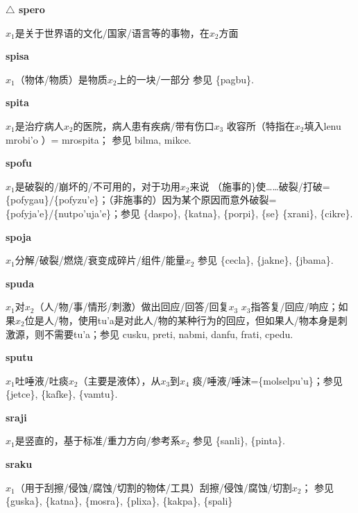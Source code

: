 \documentclass[notitlepage,twocolumn,a4paper,10pt]{book}
\begin{document}
{\sffamily\bfseries $\triangle$ spero} $x_1$是关于世界语的文化\slash{}国家\slash{}语言等的事物，在$x_2$方面

{\sffamily\bfseries spisa}\enspace {\ttfamily\bfseries[    spi]}  $x_1$（物体\slash{}物质）是物质$x_2$上的一块\slash{}一部分 \textemdash{} 参见 \{pagbu\}.

{\sffamily\bfseries spita} $x_1$是治疗病人$x_2$的医院，病人患有疾病\slash{}带有伤口$x_3$ \textemdash{} 收容所（特指在$x_2$填入lenu mrobi'o ）= {mrospita}； 参见 {bilma}, {mikce}.

{\sffamily\bfseries spofu}\enspace {\ttfamily\bfseries[pof     po'u]}  $x_1$是破裂的\slash{}崩坏的\slash{}不可用的，对于功用$x_2$来说 \textemdash{} （施事的\}使……破裂\slash{}打破= \{pofygau\}\slash{}\{pofyzu'e\}；（非施事的）因为某个原因而意外破裂= \{pofyja'e\}\slash{}\{nutpo'uja'e\}；参见 \{daspo\}, \{katna\}, \{porpi\}, \{se\} \{xrani\}, \{cikre\}.

{\sffamily\bfseries spoja}\enspace {\ttfamily\bfseries[poj     po'a]}  $x_1$分解\slash{}破裂\slash{}燃烧\slash{}衰变成碎片\slash{}组件\slash{}能量$x_2$ \textemdash{} 参见 \{cecla\}, \{jakne\}, \{jbama\}.

{\sffamily\bfseries spuda}\enspace {\ttfamily\bfseries[    spu]}  $x_1$对$x_2$（人\slash{}物\slash{}事\slash{}情形\slash{}刺激）做出回应\slash{}回答\slash{}回复$x_3$ \textemdash{} $x_3$指答复\slash{}回应\slash{}响应；如果$x_2$位是人\slash{}物，使用tu'a是对此人\slash{}物的某种行为的回应，但如果人\slash{}物本身是刺激源，则不需要tu'a；参见 {cusku}, {preti}, {nabmi}, {danfu}, {frati}, {cpedu}.

{\sffamily\bfseries sputu}\enspace {\ttfamily\bfseries[put     pu'u]}  $x_1$吐唾液\slash{}吐痰$x_2$（主要是液体），从$x_3$到$x_4$ \textemdash{} 痰\slash{}唾液\slash{}唾沫=\{molselpu'u\}；参见 \{jetce\}, \{kafke\}, \{vamtu\}.

{\sffamily\bfseries sraji}\enspace {\ttfamily\bfseries[raj]}  $x_1$是竖直的，基于标准\slash{}重力方向\slash{}参考系$x_2$ \textemdash{} 参见 \{sanli\}, \{pinta\}.

{\sffamily\bfseries sraku}\enspace {\ttfamily\bfseries[rak]}  $x_1$（用于刮擦\slash{}侵蚀\slash{}腐蚀\slash{}切割的物体\slash{}工具）刮擦\slash{}侵蚀\slash{}腐蚀\slash{}切割$x_2$； \textemdash{} 参见 \{guska\}, \{katna\}, \{mosra\}, \{plixa\}, \{kakpa\}, \{spali\}
\end{document}
